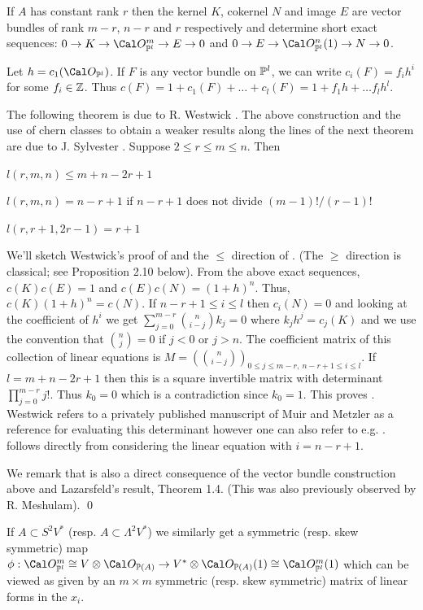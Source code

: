 If $A$ has constant rank $r$ then the kernel $K$, cokernel $N$ and image $E$
are vector bundles of rank $m-r$, $n-r$ and $r$ respectively and determine
short exact sequences:
$ 0 \to K \to \co_{\pp{l}}^m \to E \to 0$
and $0 \to E \to \co_{\pp{l}}^n(1) \to N \to 0$.

Let $h = c_1( \co_{\pp{l}})$. If $F$ is any vector bundle on $\Bbb P^{l}$,
we can write $c_i(F) = f_i h^i$ for some $f_i \in {\Bbb Z}$. Thus
$c(F) = 1 + c_1(F) + \dots + c_l(F) = 1 + f_1 h + \dots f_l h^l$.

The following theorem is due to R. Westwick \cite{W}. The above construction
and the use of chern classes to obtain a weaker results along the
lines of the next theorem are due to J. Sylvester \cite{S}. 
 \cite{W} Suppose $2 \le r \le m \le n$. Then
\roster
\item $l(r,m,n) \le m + n - 2r +1$
\item $l(r,m,n) = n - r + 1$ if $n-r+1$ does not divide $(m-1)! / (r-1)!$
\item $l(r,r+1,2r-1) = r +1$
\endroster
\endproclaim

We'll sketch Westwick's proof of  and the $\le$ direction of .
(The $\ge$ direction is classical; see Proposition 2.10 below).
From the above exact sequences, $c(K)c(E) = 1$ and $c(E)c(N) = (1+h)^n$.
Thus, $c(K)(1+h)^n = c(N)$. If $n-r+1 \le i \le l$ then $c_i(N) = 0$ and
looking at the coefficient of $h^i$ we get
$\sum_{j = 0}^{m-r} \binom{n}{i-j} k_j = 0$ where 
$k_j h^j = c_j(K)$ and 
we use the convention that 
$\binom{n}{j} = 0$ if $j<0$ or $j > n$.  The coefficient matrix of this
collection of linear equations is 
$M = ( \binom{n}{i-j})_{0 \le j \le m-r, \  n-r+1 \le i \le l}$.
If $l = m + n -2r +1$ then this is a square invertible matrix with
determinant $\prod_{j=0}^{m-r} j!$. Thus $k_0 = 0$ which is a contradiction
since $k_0 = 1$. This proves .
Westwick refers to a privately published manuscript of Muir and
 Metzler as a reference for evaluating
this determinant however one can also refer to e.g.  \cite{ACGH, pg. 93-95}.
 follows directly from considering the linear equation with $i = n-r+1$.

We remark that  is also a direct consequence of the vector
bundle construction above and Lazarsfeld's result, Theorem 1.4. (This was 
also previously observed by R. Meshulam). 
\qed
\enddemo

If $A \subset S^2V^*$ (resp. $A \subset \Lambda^2 V^*$) we similarly get
a symmetric (resp. skew symmetric) map
$\phi: \co_{\pp{l}}^m \cong  V \otimes \co_{\ppp(A)} \to
  V^* \otimes \co_{\ppp(A)}(1)
 \cong \co_{\pp{l}}^m (1)$ 
which can be viewed as given by an $m \times m$ symmetric (resp. skew
symmetric) matrix of linear forms in the $x_i$.

